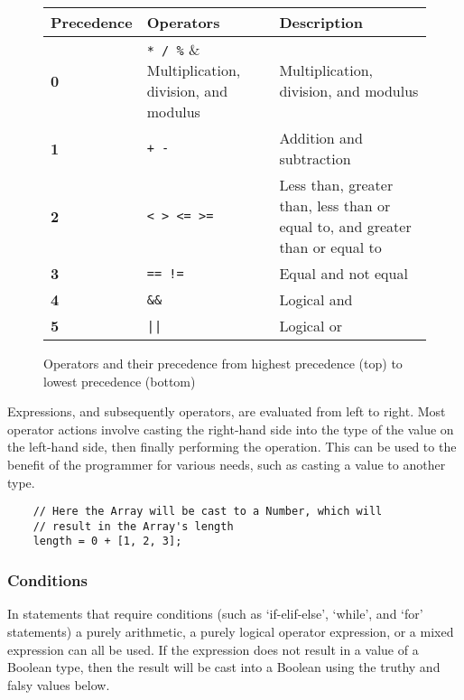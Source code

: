 \documentclass[12pt, letterpaper]{article}
\begin{document}
\begin{figure}[H]
    \begin{center}
        \begin{tabular}{| m{2cm} | m{2cm} | m{5cm} |}
            \hline
            Precedence & Operators & Description\\
            \hline
            \textbf{0} & \verb|* / %| & Multiplication, division, and modulus\\
            \hline
            \textbf{1} & \verb|+ -| & Addition and subtraction\\
            \hline
            \textbf{2} & \verb|< > <= >=| & Less than, greater than, less than or equal to, and greater than or equal to\\
            \hline
            \textbf{3} & \verb|== !=| & Equal and not equal\\
            \hline
            \textbf{4} & \verb|&&| & Logical and\\
            \hline
            \textbf{5} & \verb+||+ & Logical or\\
            \hline
        \end{tabular}
    \end{center}
    \caption{Operators and their precedence from highest precedence (top) to lowest precedence (bottom)}
\end{figure}

Expressions, and subsequently operators, are evaluated from left to right. Most operator actions involve casting the right-hand side into the type of the value on the left-hand side, then finally performing the operation. This can be used to the benefit of the programmer for various needs, such as casting a value to another type.

\begin{verbatim}
    // Here the Array will be cast to a Number, which will 
    // result in the Array's length
    length = 0 + [1, 2, 3];
\end{verbatim}

\subsubsection{Conditions}

In statements that require conditions (such as `if-elif-else', `while', and `for' statements) a purely arithmetic, a purely logical operator expression, or a mixed expression can all be used. If the expression does not result in a value of a Boolean type, then the result will be cast into a Boolean using the truthy and falsy values below.
\end{document}
